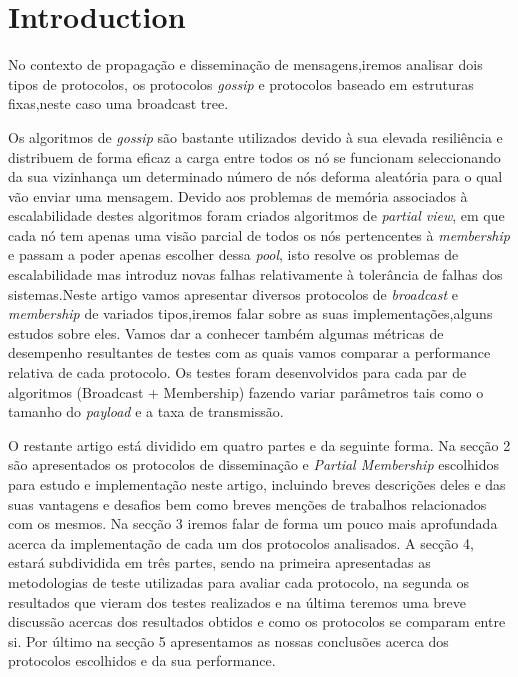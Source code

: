 \section{Introduction}
%
No contexto de propagação e disseminação de mensagens,iremos analisar dois tipos de protocolos, os protocolos \textit{gossip} e protocolos baseado em estruturas fixas,neste caso uma broadcast tree.

Os algoritmos de \textit{gossip} são bastante utilizados devido à sua elevada resiliência e distribuem de forma eficaz a carga entre todos os nó se funcionam seleccionando da sua vizinhança um determinado número de nós deforma aleatória para o qual vão enviar uma mensagem. Devido aos problemas de memória associados à escalabilidade destes algoritmos foram criados algoritmos de \textit{partial view}, em que cada nó tem apenas uma visão parcial de todos os nós pertencentes à \textit{membership} e passam a poder apenas escolher dessa \textit{pool}, isto resolve os problemas de escalabilidade mas introduz novas falhas relativamente à tolerância de falhas dos sistemas.Neste artigo vamos apresentar diversos protocolos de \textit{broadcast} e \textit{membership} de variados tipos,iremos falar sobre as suas implementações,alguns estudos sobre eles. Vamos dar a conhecer também algumas métricas de desempenho resultantes de testes com as quais vamos comparar a performance relativa de cada protocolo. Os testes foram desenvolvidos para cada par de algoritmos (Broadcast + Membership) fazendo variar parâmetros tais como o tamanho do \textit{payload} e a taxa de transmissão.

O restante artigo está dividido em quatro partes e da seguinte forma. Na secção 2 são apresentados os protocolos de disseminação e \textit{Partial Membership} escolhidos para estudo e implementação neste artigo, incluindo breves descrições deles e das suas vantagens e desafios bem como breves menções de trabalhos relacionados com os mesmos. Na secção 3 iremos falar de forma um pouco mais aprofundada acerca da implementação de cada um dos protocolos analisados. A secção 4, estará subdividida em três partes, sendo na primeira apresentadas as metodologias de teste utilizadas para avaliar cada protocolo, na segunda os resultados que vieram dos testes realizados e na última teremos uma breve discussão acercas dos resultados obtidos e como os protocolos se comparam entre si. Por último na secção 5 apresentamos as nossas conclusões acerca dos protocolos escolhidos e da sua performance.
